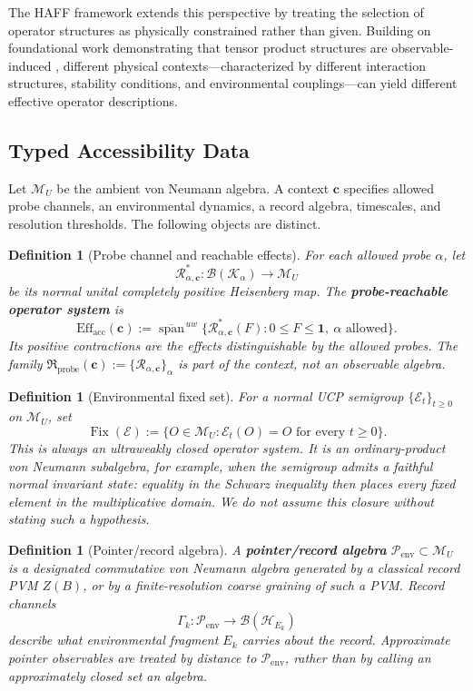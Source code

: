 \documentclass[12pt,a4paper,openany]{book}
\newtheorem{definition}[theorem]{Definition}
\begin{document}
The HAFF framework extends this perspective by treating the selection of operator structures as physically constrained rather than given. Building on foundational work demonstrating that tensor product structures are observable-induced \cite{Zanardi2001,Zanardi2004}, different physical contexts---characterized by different interaction structures, stability conditions, and environmental couplings---can yield different effective operator descriptions.

\subsection{Typed Accessibility Data}

Let $\mathcal M_U$ be the ambient von Neumann algebra.  A context $\mathbf c$ specifies allowed probe channels, an environmental dynamics, a record algebra, timescales, and resolution thresholds.  The following objects are distinct.

\begin{definition}[Probe channel and reachable effects]
\label{E-def:probe-effects}
For each allowed probe $\alpha$, let
\[
\mathcal R_{\alpha,\mathbf c}^{*}:\mathcal B(\mathcal K_\alpha)\longrightarrow\mathcal M_U
\]
be its normal unital completely positive Heisenberg map.  The \textbf{probe-reachable operator system} is
\[
\mathrm{Eff}_{\mathrm{acc}}(\mathbf c)
:=\overline{\operatorname{span}}^{\,uw}
\{\mathcal R_{\alpha,\mathbf c}^{*}(F):0\le F\le\mathbf 1,
\ \alpha\text{ allowed}\}.
\]
Its positive contractions are the effects distinguishable by the allowed probes.  The family $\mathfrak R_{\mathrm{probe}}(\mathbf c):=\{\mathcal R_{\alpha,\mathbf c}\}_\alpha$ is part of the context, not an observable algebra.
\end{definition}

\begin{definition}[Environmental fixed set]
\label{E-def:fixed-set}
For a normal UCP semigroup $\{\mathcal E_t\}_{t\ge0}$ on $\mathcal M_U$, set
\[
\operatorname{Fix}(\mathcal E)
:=\{O\in\mathcal M_U:\mathcal E_t(O)=O\text{ for every }t\ge0\}.
\]
This is always an ultraweakly closed operator system.  It is an ordinary-product von Neumann subalgebra, for example, when the semigroup admits a faithful normal invariant state: equality in the Schwarz inequality then places every fixed element in the multiplicative domain.  We do not assume this closure without stating such a hypothesis.
\end{definition}

\begin{definition}[Pointer/record algebra]
\label{E-def:pointer-algebra}
A \textbf{pointer/record algebra} $\mathcal P_{\mathrm{env}}\subset\mathcal M_U$ is a designated commutative von Neumann algebra generated by a classical record PVM $Z(B)$, or by a finite-resolution coarse graining of such a PVM.  Record channels
\[
\Gamma_k:\mathcal P_{\mathrm{env}}\longrightarrow\mathcal B(\mathcal H_{E_k})
\]
describe what environmental fragment $E_k$ carries about the record.  Approximate pointer observables are treated by distance to $\mathcal P_{\mathrm{env}}$, rather than by calling an approximately closed set an algebra.
\end{definition}
\end{document}
